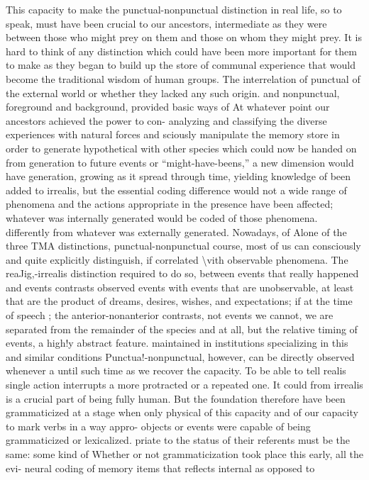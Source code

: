 This capacity to make the punctual-nonpunctual distinction in real life, so to speak, must have been crucial to our ancestors, inter\-mediate as they were between those who might prey on them and those on whom they might prey. It is hard to think of any distinction
which could have been more important for them to make as they began to build up the store of communal experience that would become
the traditional wisdom of human groups. The interrelation of punctual of the external world or whether they lacked any such origin.
and nonpunctual, foreground and background, provided basic ways of At whatever point our ancestors achieved the power to con- analyzing and classifying the diverse experiences with natural forces and sciously manipulate the memory store in order to generate hypothetical with other species which could now be handed on from generation to future events or ``might-have-beens,'' a new dimension would have generation, growing as it spread through time, yielding knowledge of been added to irrealis, but the essential coding difference would not a wide range of phenomena and the actions appropriate in the presence have been affected; whatever was internally generated would be coded of those phenomena. differently from whatever was externally generated. Nowadays, of Alone of the three TMA distinctions, punctual-nonpunctual course, most of us can consciously and quite explicitly distinguish, if correlated {\textbackslash}vith observable phenomena. The reaJig,-irrealis distinction required to do so, between events that really happened and events contrasts observed events with events that are unobservable, at least that are the product of dreams, desires, wishes, and expectations; if at the time of speech ; the anterior-nonanterior contrasts, not events we cannot, we are separated from the remainder of the species and at all, but the relative timing of events, a high!y abstract feature. maintained in institutions specializing in this and similar conditions Punctua!-nonpunctual, however, can be directly observed whenever a until such time as we recover the capacity. To be able to tell realis single action interrupts a more protracted or a repeated one. It could from irrealis is a crucial part of being fully human. But the foundation therefore have been grammaticized at a stage when only physical of this capacity and of our capacity to mark verbs in a way appro- objects or events were capable of being grammaticized or lexicalized. priate to the status of their referents must be the same: some kind of Whether or not grammaticization took place this early, all the evi- neural coding of memory items that reflects internal as opposed to

